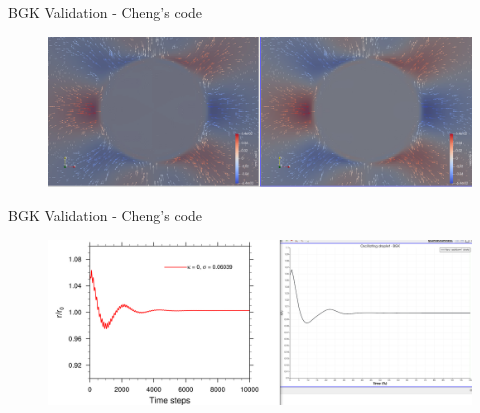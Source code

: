 \documentclass[8pt]{beamer}
\begin{document}
	\begin{frame}{BGK Validation - Cheng's code}
		\begin{figure}
			\centering
			\includegraphics[scale=0.14]{pics/BGK_VelFieldComparison.png}
		\end{figure}
	\end{frame}
	\begin{frame}{BGK Validation - Cheng's code}
		\begin{figure}
			\centering
			\includegraphics[scale=0.14]{pics/OScDroplet_BGK_Axis.png}
		\end{figure}
	\end{frame}
	
\end{document}
